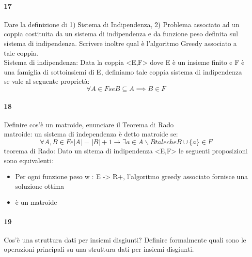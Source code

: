\documentclass[12pt, a4paper, openany]{book}
\begin{document}
\paragraph{17}
Dare la definizione di 1) Sistema di Indipendenza, 2) Problema associato ad
un coppia costituita da un sistema di indipendenza e da funzione peso definita
sul sistema di indipendenza. Scrivere inoltre qual è l’algoritmo Greedy
associato a tale coppia.\\
Sistema di indipendenza: Data la coppia <E,F> dove E è un insieme finito e F è una famiglia di sottoinsiemi di E, definiamo tale coppia sistema di indipendenza se vale al seguente proprietà:
\begin{equation*}
    \forall A \in F se B \subseteq A \implies B \in F
\end{equation*}
\paragraph{18}
Definire cos’è un matroide, enunciare il Teorema di Rado\\
matroide: un sistema di independenza è detto matroide se:
\begin{equation*}
    \forall A, B \in F e |A| = |B| + 1 \rightarrow \exists a \in A\backslash B tale che B \cup \{a\} \in F
\end{equation*}
teorema di Rado: Dato un sitema di indipendenza <E,F> le seguenti proposizioni sono equivalenti:
\begin{itemize}
    \item Per ogni funzione peso w : E -> R+, l'algoritmo greedy associato fornisce una soluzione ottima
    \item <E,F> è un matroide
\end{itemize}
\paragraph{19}
Cos’è una struttura dati per insiemi disgiunti? Definire formalmente quali
sono le operazioni principali su una struttura dati per insiemi disgiunti.
\end{document}

